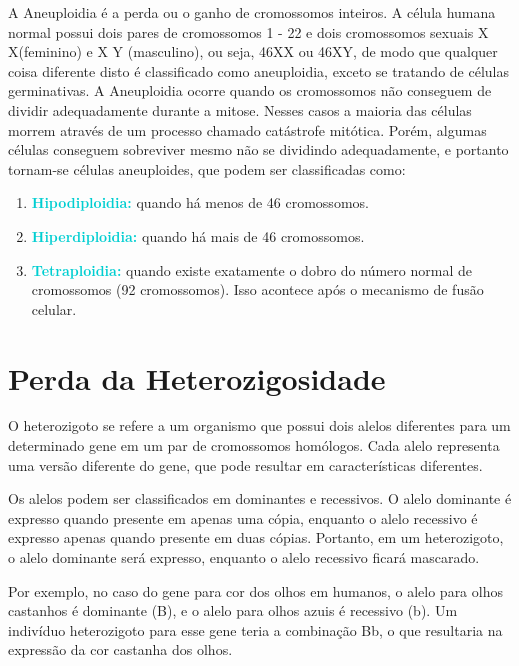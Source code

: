\documentclass[11pt,a4paper]{article}
\newcounter{exemplo}
\begin{document}
	
		A \textcolor{CarnationPink}{Aneuploidia} é a perda ou o ganho de cromossomos inteiros. A célula humana normal possui dois pares de cromossomos 1 - 22 e dois cromossomos sexuais X  X(feminino) e X Y (masculino), ou seja, 46XX ou 46XY, de modo que qualquer coisa diferente disto é classificado como aneuploidia, exceto se tratando de células germinativas. A Aneuploidia ocorre quando os cromossomos não conseguem de dividir adequadamente durante a mitose. Nesses casos a maioria das células morrem através de um processo chamado catástrofe mitótica. Porém, algumas células conseguem sobreviver mesmo não se dividindo adequadamente, e portanto tornam-se células aneuploides, que podem ser classificadas como:

			\begin{enumerate}
				\item \textcolor{DarkTurquoise}{\textbf{Hipodiploidia:}} quando há menos de 46 cromossomos.
				\item \textcolor{DarkTurquoise}{\textbf{Hiperdiploidia:}}  quando há mais de 46 cromossomos.
				\item \textcolor{DarkTurquoise}{\textbf{Tetraploidia:}} quando existe exatamente o dobro do número normal de cromossomos (92 cromossomos). Isso acontece após o mecanismo de fusão celular.
			\end{enumerate}

	\section{Perda da Heterozigosidade}

		O heterozigoto se refere a um organismo que possui dois alelos diferentes para um determinado gene em um par de cromossomos homólogos. Cada alelo representa uma versão diferente do gene, que pode resultar em características diferentes.

		Os alelos podem ser classificados em dominantes e recessivos. O alelo dominante é expresso quando presente em apenas uma cópia, enquanto o alelo recessivo é expresso apenas quando presente em duas cópias. Portanto, em um heterozigoto, o alelo dominante será expresso, enquanto o alelo recessivo ficará mascarado.

		Por exemplo, no caso do gene para cor dos olhos em humanos, o alelo para olhos castanhos é dominante (B), e o alelo para olhos azuis é recessivo (b). Um indivíduo heterozigoto para esse gene teria a combinação Bb, o que resultaria na expressão da cor castanha dos olhos.
	
\end{document}
